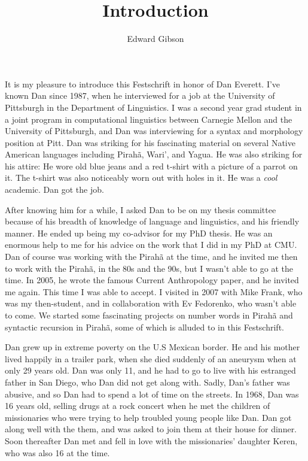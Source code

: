 \documentclass[output=paper,colorlinks,citecolor=brown
]{langscibook}
\author{Edward Gibson\orcid{}\affiliation{MIT} }
\title{Introduction} %
\begin{document}
\maketitle

It is my pleasure to introduce this Festschrift in honor of Dan Everett. I've known Dan since 1987, when he interviewed for a job at the University of Pittsburgh in the Department of Linguistics. I was a second year grad student in a joint program in computational linguistics between Carnegie Mellon and the University of Pittsburgh, and Dan was interviewing for a syntax and morphology position at Pitt. Dan was striking for his fascinating material on several Native American languages including Pirahã, Wari', and Yagua. He was also striking for his attire: He wore old blue jeans and a red t-shirt with a picture of a parrot on it.  The t-shirt was also noticeably worn out with holes in it. He was a \textit{cool} academic. Dan got the job. 

After knowing him for a while, I asked Dan to be on my thesis committee because of his breadth of knowledge of language and linguistics, and his friendly manner. He ended up being my co-advisor for my PhD thesis. He was an enormous help to me for his advice on the work that I did in my PhD at CMU. Dan of course was working with the Pirahã at the time, and he invited me then to work with the Pirahã, in the 80s and the 90s, but I wasn't able to go at the time. In 2005, he wrote the famous Current Anthropology paper, and he invited me again. This time I was able to accept. I visited in 2007 with Mike Frank, who was my then-student, and in collaboration with Ev Fedorenko, who wasn't able to come. We started some fascinating projects on number words in Pirahã and syntactic recursion in Pirahã, some of which is alluded to in this Festschrift. 

Dan grew up in extreme poverty on the U.S Mexican border. He and his mother lived happily in a trailer park, when she died suddenly of an aneurysm when at only 29 years old. Dan was only 11, and he had to go to live with his estranged father in San Diego, who Dan did not get along with. Sadly, Dan's father was abusive, and so Dan had to spend a lot of time on the streets. In 1968, Dan was 16 years old, selling drugs at a rock concert when he met the children of missionaries who were trying to help troubled young people like Dan. Dan got along well with the them, and was asked to join them at their house for dinner. Soon thereafter Dan met and fell in love with the missionaries' daughter Keren, who was also 16 at the time.
\end{document}
